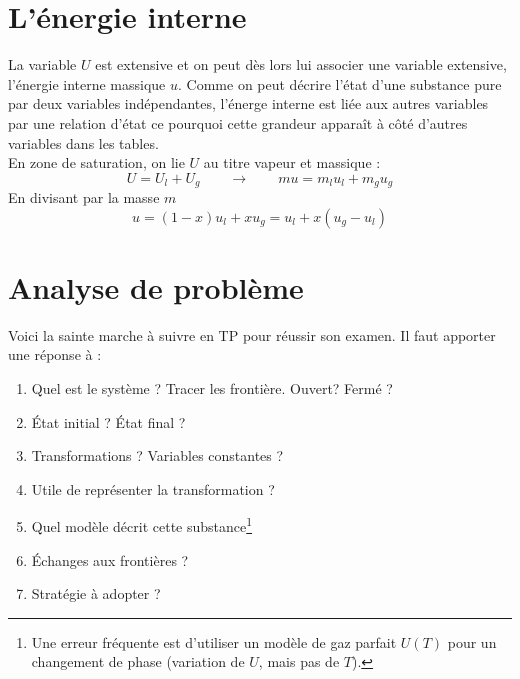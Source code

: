 \section{L'énergie interne}
La variable $U$ est extensive et on peut dès lors lui associer une 
variable extensive, l'énergie interne massique $u$. Comme on peut 
décrire l'état d'une substance pure par deux variables indépendantes, 
l'énerge interne est liée aux autres variables par une relation d'état 
ce pourquoi cette grandeur apparaît à côté d'autres variables dans les 
tables.\\
En zone de saturation, on lie $U$ au titre vapeur et massique :
\begin{equation}
U = U_l+U_g \qquad\rightarrow\qquad mu = m_lu_l + m_gu_g
\end{equation}
En divisant par la masse $m$
\begin{equation}
u = (1-x)u_l + xu_g = u_l + x(u_g-u_l)
\end{equation}

\section{Analyse de problème}
Voici la sainte marche à suivre en TP pour réussir son examen. Il 
faut apporter une réponse à : 
\begin{enumerate}
\item Quel est le système ? Tracer les frontière. Ouvert? Fermé ?
\item État initial ? État final ?
\item Transformations ? Variables constantes ?
\item Utile de représenter la transformation ?
\item Quel modèle décrit cette substance\footnote{Une erreur fréquente 
est d'utiliser un modèle de gaz parfait $U(T)$ pour un changement de 
phase (variation de $U$, mais pas de $T$).}
\item Échanges aux frontières ?
\item Stratégie à adopter ?
\end{enumerate}

